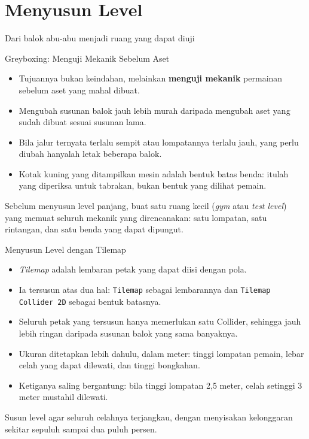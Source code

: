 \documentclass[aspectratio=169,10pt]{beamer}
\begin{document}
\section{Menyusun Level}
  {Dari balok abu-abu menjadi ruang yang dapat diuji}

\begin{frame}{Greyboxing: Menguji Mekanik Sebelum Aset}
\begin{itemize}
  \item Tujuannya bukan keindahan, melainkan \textbf{menguji mekanik}
        permainan sebelum aset yang mahal dibuat.
  \item Mengubah susunan balok jauh lebih murah daripada mengubah aset yang
        sudah dibuat sesuai susunan lama.
  \item Bila jalur ternyata terlalu sempit atau lompatannya terlalu jauh, yang
        perlu diubah hanyalah letak beberapa balok.
  \item Kotak kuning yang ditampilkan mesin adalah bentuk batas benda: itulah
        yang diperiksa untuk tabrakan, bukan bentuk yang dilihat pemain.
\end{itemize}
\begin{kotak}
Sebelum menyusun level panjang, buat satu ruang kecil (\emph{gym} atau
\emph{test level}) yang memuat seluruh mekanik yang direncanakan: satu
lompatan, satu rintangan, dan satu benda yang dapat dipungut.
\end{kotak}
\end{frame}

\begin{frame}{Menyusun Level dengan Tilemap}
\begin{itemize}
  \item \emph{Tilemap} adalah lembaran petak yang dapat diisi dengan pola.
  \item Ia tersusun atas dua hal: \texttt{Tilemap} sebagai lembarannya dan
        \texttt{Tilemap Collider 2D} sebagai bentuk batasnya.
  \item Seluruh petak yang tersusun hanya memerlukan satu Collider, sehingga
        jauh lebih ringan daripada susunan balok yang sama banyaknya.
  \item Ukuran ditetapkan lebih dahulu, dalam meter: tinggi lompatan pemain,
        lebar celah yang dapat dilewati, dan tinggi bongkahan.
  \item Ketiganya saling bergantung: bila tinggi lompatan 2,5 meter, celah
        setinggi 3 meter mustahil dilewati.
\end{itemize}
\begin{kotak}
Susun level agar seluruh celahnya terjangkau, dengan menyisakan kelonggaran
sekitar sepuluh sampai dua puluh persen.
\end{kotak}
\end{frame}
\end{document}
